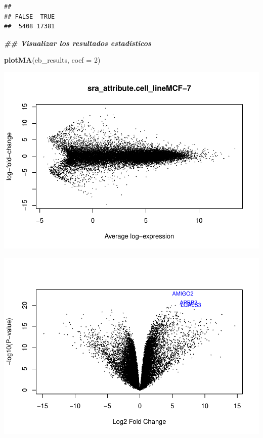 \documentclass[
]{article}
\newenvironment{Shaded}{\begin{snugshade}}{\end{snugshade}}
\newcommand{\AttributeTok}[1]{\textcolor[rgb]{0.13,0.29,0.53}{#1}}
\newcommand{\DecValTok}[1]{\textcolor[rgb]{0.00,0.00,0.81}{#1}}
\newcommand{\DocumentationTok}[1]{\textcolor[rgb]{0.56,0.35,0.01}{\textbf{\textit{#1}}}}
\newcommand{\FunctionTok}[1]{\textcolor[rgb]{0.13,0.29,0.53}{\textbf{#1}}}
\newcommand{\NormalTok}[1]{#1}
\newcommand{\SpecialCharTok}[1]{\textcolor[rgb]{0.81,0.36,0.00}{\textbf{#1}}}
\begin{document}
\begin{verbatim}
## 
## FALSE  TRUE 
##  5408 17381
\end{verbatim}

\begin{Shaded}
\begin{Highlighting}[]
\DocumentationTok{\#\# Visualizar los resultados estadísticos}

\FunctionTok{plotMA}\NormalTok{(eb\_results, }\AttributeTok{coef =} \DecValTok{2}\NormalTok{)}
\end{Highlighting}
\end{Shaded}

\includegraphics{Proyecto_RNAseq_files/figure-latex/unnamed-chunk-13-1.pdf}

\begin{Shaded}
\end{Shaded}

\includegraphics{Proyecto_RNAseq_files/figure-latex/unnamed-chunk-13-2.pdf}
\end{document}
